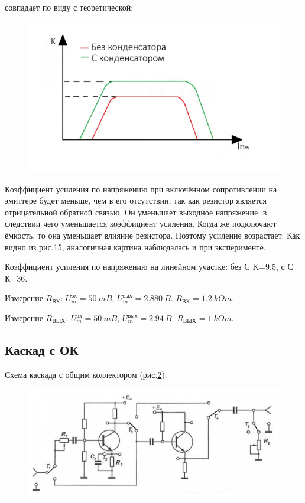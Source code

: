 совпадает по виду с теоретической:
\begin{figure}[H]
	\centering
	\includegraphics[width=0.6\linewidth]{fig/fig14}
	\caption{}
	\label{fig:16}
\end{figure}

Коэффициент усиления по напряжению при включённом сопротивлении на эмиттере будет меньше, чем в его отсутствии, так как резистор является отрицательной обратной связью. Он уменьшает выходное напряжение, в следствии чего уменьшается коэффициент усиления. Когда же подключают ёмкость, то она уменьшает влияние резистора. Поэтому усиление возрастает.
Как видно из рис.15, аналогичная картина наблюдалась и при эксперименте.

Коэффициент усиления по напряжению на линейном участке: без С K=9.5, с С К=36.

Измерение $R_{\text{ВХ}}$: $U_m^{\text{вх}}= 50 ~mB$, $U_m^{\text{вых}}= 2.880~ B$. $R_{\text{ВХ}}=1.2 ~ kOm$.

Измерение $R_{\text{ВЫХ}}$: $U_m^{\text{вх}}= 50 ~mB$, $U_m^{\text{вых}}= 2.94 ~B$. $R_{\text{ВЫХ}}=1 ~ kOm$.

\subsection{Каскад с ОК}
Схема каскада с общим коллектором (рис.\ref{fig:17}). 

\begin{figure}[h!]
	\centering
	\includegraphics[width=0.8\linewidth]{fig/fig82}
	\caption{}
	\label{fig:17}
\end{figure}

